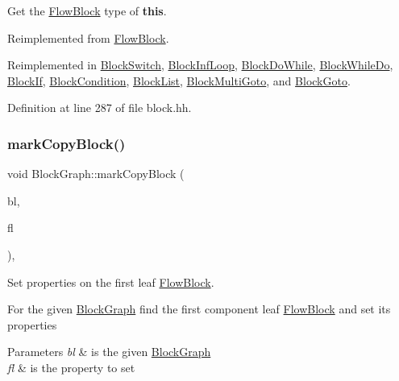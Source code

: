 Get the \mbox{\hyperlink{class_flow_block}{Flow\+Block}} type of {\bfseries{this}}. 



Reimplemented from \mbox{\hyperlink{class_flow_block_ae036068cc610d97a5461f9bcf75bd43d}{Flow\+Block}}.



Reimplemented in \mbox{\hyperlink{class_block_switch_a9796f852aa205ba32346ae9d249f94c1}{Block\+Switch}}, \mbox{\hyperlink{class_block_inf_loop_a798896823e2c790567144b525753eca7}{Block\+Inf\+Loop}}, \mbox{\hyperlink{class_block_do_while_a3700fcac8afffc121249a49af054269e}{Block\+Do\+While}}, \mbox{\hyperlink{class_block_while_do_a7bb1454de32707fac664051525c58d47}{Block\+While\+Do}}, \mbox{\hyperlink{class_block_if_a6fb92878f6e42112610ac0dee44c63a9}{Block\+If}}, \mbox{\hyperlink{class_block_condition_a654b72b19819b68c6f09e507dfee4ddd}{Block\+Condition}}, \mbox{\hyperlink{class_block_list_ab77ac8f833192e59773b7e3829823dc5}{Block\+List}}, \mbox{\hyperlink{class_block_multi_goto_a9fd5bfdaa3202a1cd604213c2be88bf2}{Block\+Multi\+Goto}}, and \mbox{\hyperlink{class_block_goto_a11f324c0fdd3849a53250a0d67b6c94e}{Block\+Goto}}.



Definition at line 287 of file block.\+hh.

\mbox{\label{class_block_graph_ad522a7201e4327411cd161b04d57f1da}} 
\subsubsection{\texorpdfstring{markCopyBlock()}{markCopyBlock()}}
{\footnotesize\ttfamily void Block\+Graph\+::mark\+Copy\+Block (\begin{DoxyParamCaption}\item[{\mbox{\hyperlink{class_flow_block}{Flow\+Block}} $\ast$}]{bl,  }\item[{uint4}]{fl }\end{DoxyParamCaption})\hspace{0.3cm}{\ttfamily [static]}, {\ttfamily [protected]}}



Set properties on the first leaf \mbox{\hyperlink{class_flow_block}{Flow\+Block}}. 

For the given \mbox{\hyperlink{class_block_graph}{Block\+Graph}} find the first component leaf \mbox{\hyperlink{class_flow_block}{Flow\+Block}} and set its properties 
\begin{DoxyParams}{Parameters}
{\em bl} & is the given \mbox{\hyperlink{class_block_graph}{Block\+Graph}} \\
\hline
{\em fl} & is the property to set \\
\hline
\end{DoxyParams}


